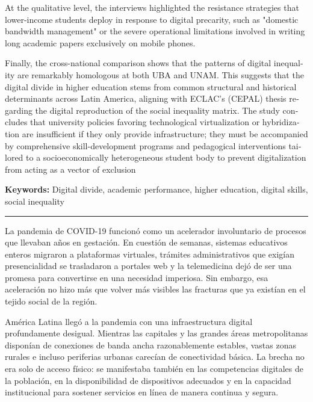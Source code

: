 \documentclass{article}
\begin{document}
\begin{tcolorbox}[colback=brown!8!white,colframe=brown!8!white,boxrule=0pt,arc=2pt,left=4pt,right=4pt,top=3pt,bottom=3pt,before skip=4pt,after skip=4pt]
\begin{otherlanguage}{english}
At the qualitative level, the interviews highlighted the resistance strategies that lower-income students deploy in response to digital precarity, such as "domestic bandwidth management" or the severe operational limitations involved in writing long academic papers exclusively on mobile phones.

Finally, the cross-national comparison shows that the patterns of digital inequality are remarkably homologous at both UBA and UNAM. This suggests that the digital divide in higher education stems from common structural and historical determinants across Latin America, aligning with ECLAC’s (CEPAL) thesis regarding the digital reproduction of the social inequality matrix. The study concludes that university policies favoring technological virtualization or hybridization are insufficient if they only provide infrastructure; they must be accompanied by comprehensive skill-development programs and pedagogical interventions tailored to a socioeconomically heterogeneous student body to prevent digitalization from acting as a vector of exclusion
\par\smallskip\noindent\textbf{Keywords:} Digital divide, academic performance, higher education, digital skills, social inequality
\end{otherlanguage}
\end{tcolorbox}

\bigskip
\noindent\rule{\linewidth}{0.4pt}
\bigskip

La pandemia de COVID-19 funcionó como un acelerador involuntario de procesos que llevaban años en gestación. En cuestión de semanas, sistemas educativos enteros migraron a plataformas virtuales, trámites administrativos que exigían presencialidad se trasladaron a portales web y la telemedicina dejó de ser una promesa para convertirse en una necesidad imperiosa. Sin embargo, esa aceleración no hizo más que volver más visibles las fracturas que ya existían en el tejido social de la región.

América Latina llegó a la pandemia con una infraestructura digital profundamente desigual. Mientras las capitales y las grandes áreas metropolitanas disponían de conexiones de banda ancha razonablemente estables, vastas zonas rurales e incluso periferias urbanas carecían de conectividad básica. La brecha no era solo de acceso físico: se manifestaba también en las competencias digitales de la población, en la disponibilidad de dispositivos adecuados y en la capacidad institucional para sostener servicios en línea de manera continua y segura.
\end{document}
